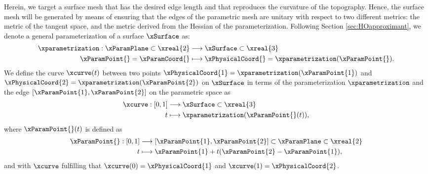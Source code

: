 \documentclass[1p]{elsarticle}
\begin{document}
Herein, we target a surface mesh that has the desired edge length and that reproduces the curvature of the topography.
Hence, the surface mesh will be generated by means of ensuring that the edges of the parametric mesh are unitary with respect to two different metrics: the metric of the tangent space, and the metric derived from the Hessian of the parameterization.
Following Section \ref{sec:HOapproximant}, we denote a general parameterization of a surface $\xSurface$ as:
\begin{eqnarray}
\label{eq:parameterizationGeneral}
\begin{aligned}
\xparametrization:\xParamPlane\subset\xreal{2}
&\longrightarrow\xSurface\subset\xreal{3}\\
\xParamPoint{}=\xParamCoord{}
&\longmapsto\xPhysicalCoord{}
= \xparametrization(\xParamPoint{}).%
\end{aligned}
\end{eqnarray}
We define the curve  $\xcurve(t)$ between two points $\xPhysicalCoord{1}=\xparametrization(\xParamPoint{1})$ and $\xPhysicalCoord{2}=\xparametrization(\xParamPoint{2})$ on $\xSurface$ in terms of the parameterization $\xparametrization$ and the edge  $[\xParamPoint{1}, \xParamPoint{2} ]$ on the parametric space as
\begin{equation}
\label{eq:curveSurface}
\begin{aligned}
\xcurve:[0,1]&\longrightarrow\xSurface\subset\xreal{3}\\
t&\longmapsto
\xparametrization(\xParamPoint{}(t)), %
\end{aligned}
\end{equation}
where $\xParamPoint{}(t)$ is defined as
\begin{equation}
\label{eq:edgeParametricSpace}
\begin{aligned}
\xParamPoint{}:[0,1]&\longrightarrow[\xParamPoint{1}, \xParamPoint{2} ]\subset\xParamPlane\subset\xreal{2}\\
t&\longmapsto \xParamPoint{1}+t(\xParamPoint{2}-\xParamPoint{1}),
\end{aligned}
\end{equation}
and
with  $\xcurve$ fulfilling that $\xcurve(0) = \xPhysicalCoord{1}$ and $\xcurve(1)=\xPhysicalCoord{2}$. 
\end{document}
